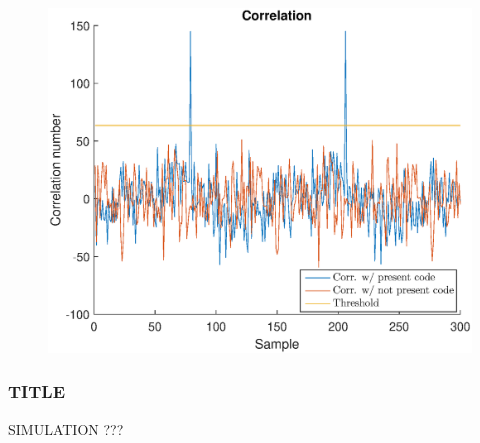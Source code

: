 \documentclass{beamer}
\begin{document}
\begin{frame}
\begin{figure}[!tbp]
\begin{minipage}[b]{0.4\textwidth}
		    \includegraphics[width=\textwidth]{../chapters/evaluation-chapters/hardware/ac/correlation-ac-testbed.eps}
		  \end{minipage}
		\end{figure}



	\end{frame}







	\begin{frame}\frametitle{TITLE}
		SIMULATION ???
	\end{frame}
\end{document}

